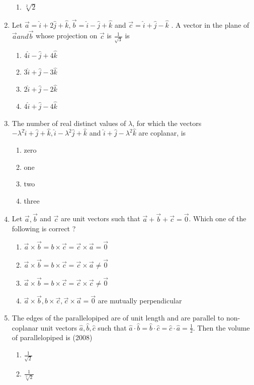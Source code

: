 \documentclass[12pt]{article}
\begin{document}
\begin{enumerate}
\begin{enumerate}
\item $\sqrt[2]{2}$
\end{enumerate}
\item Let $\vec{a}=\hat{i}+2\hat{j}+\hat{k},\vec{b}=\hat{i}-\hat{j}+\hat{k}$ and $\vec{c}=\hat{i}+\hat{j}-\hat{k}$ . A vector in the plane of $\vec{a} and \vec{b}$ whose projection on $\vec{c}$ is $\frac{1}{\sqrt{3}}$ is
\begin{enumerate}
\item $4\hat{i}-\hat{j}+4\hat{k}$
\item $3\hat{i}+\hat{j}-3\hat{k}$
\item $2\hat{i}+\hat{j}-2\hat{k}$
\item $4\hat{i}+\hat{j}-4\hat{k}$
\end{enumerate}
\item The number of real distinct values of $\lambda$, for which the vectors $-\lambda^2\hat{i}+\hat{j}+\hat{k},\hat{i}-\lambda^2\hat{j}+\hat{k}$ and $\hat{i}+\hat{j}-\lambda^2\hat{k}$ are coplanar, is
\begin{enumerate}
\item zero 
\item one 
\item two 
\item three
\end{enumerate}
\item Let $\vec{a},\vec{b}$ and $\vec{c}$ are unit vectors such that $\vec{a}+\vec{b}+\vec{c}=\vec{0}$. Which one of the following is correct ?
\begin{enumerate}
\item $\vec{a}\times\vec{b}=b\times\vec{c}=\vec{c}\times\vec{a}=\vec{0}$
\item $\vec{a}\times\vec{b}=b\times\vec{c}=\vec{c}\times\vec{a}\neq\vec{0}$
\item $\vec{a}\times\vec{b}=b\times\vec{c}=\vec{c}\times\vec{c}\neq\vec{0}$
\item $\vec{a}\times\vec{b},b\times\vec{c},\vec{c}\times\vec{a}=\vec{0}$ are mutually perpendicular
\end{enumerate}
\item The edges of the parallelopiped are of unit length and are parallel to non- coplanar unit vectors $\hat{a},\hat{b},\hat{c}$ such that $\hat{a}\cdot\hat{b}=\hat{b}\cdot\hat{c}=\hat{c}\cdot\hat{a}=\frac{1}{2}$. Then the volume of parallelopiped is  (2008)
\begin{enumerate}
\item $\frac{1}{\sqrt{2}}$
\item $\frac{1}{\sqrt[2]{2}}$

\end{enumerate}
\end{enumerate}
\end{document}
